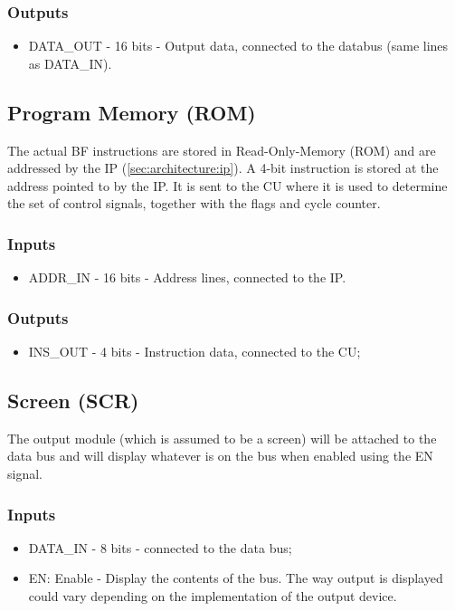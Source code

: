 \subsubsection*{Outputs}
\begin{itemize}
\itemsep0em 
\item DATA\_OUT - 16 bits - Output data, connected to the databus (same lines as DATA\_IN).
\end{itemize}

\subsection{Program Memory (ROM)} \label{sec:architecture:rom}
The actual BF instructions are stored in Read-Only-Memory (ROM) and are addressed by the IP (\ref{sec:architecture:ip}). A 4-bit instruction is stored at the address pointed to by the IP. It is sent to the CU where it is used to determine the set of control signals, together with the flags and cycle counter.

\subsubsection*{Inputs}
\begin{itemize}
\itemsep0em 
\item ADDR\_IN - 16 bits - Address lines, connected to the IP.
\end{itemize}

\subsubsection*{Outputs}
\begin{itemize}
\itemsep0em 
\item INS\_OUT - 4 bits - Instruction data, connected to the CU;
\end{itemize}


\subsection{Screen (SCR)}  \label{sec:architecture:scr}
The output module (which is assumed to be a screen) will be attached to the data bus and will display whatever is on the bus  when enabled using the EN signal.
\subsubsection*{Inputs}
\begin{itemize}
\itemsep0em 
\item DATA\_IN - 8 bits - connected to the data bus;
\item EN: Enable - Display the contents of the bus. The way output is displayed could vary depending on the implementation of the output device.
\end{itemize}

